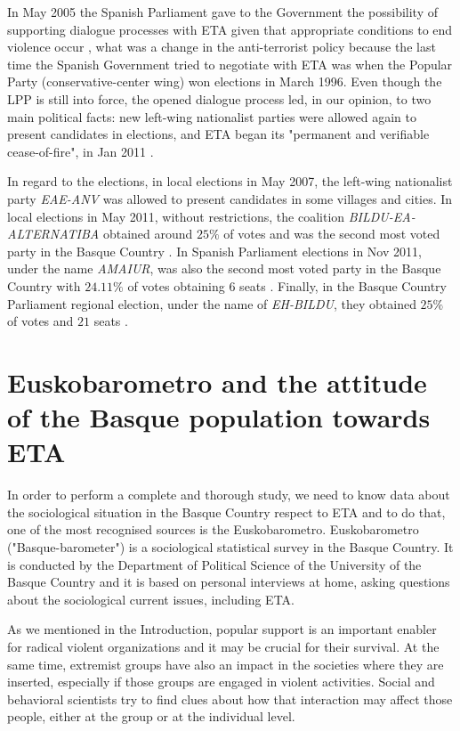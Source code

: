 In May 2005 the Spanish Parliament gave to the Government the possibility of supporting dialogue processes with ETA given that appropriate conditions to end violence occur \cite[Resoluci\'on 34, p. 13]{Congreso}, what was a change in the anti-terrorist policy because the last time the Spanish Government tried to negotiate with ETA was when the Popular Party (conservative-center wing) won elections in March 1996. Even though the LPP is still into force, the opened dialogue process led, in our opinion, to two main political facts: new left-wing nationalist parties were allowed again to present candidates in elections, and ETA began its "permanent and verifiable cease-of-fire", in Jan 2011 \cite{ceaseFire}. 

In regard to the elections, in local elections in May 2007, the left-wing nationalist party \textit{EAE-ANV} was allowed to present candidates in some villages and cities. In local elections in May 2011, without  restrictions, the coalition \textit{BILDU-EA-ALTERNATIBA} obtained around $25\%$ of votes and was the second most voted party in the Basque Country \cite{mir}. In Spanish Parliament elections in Nov 2011, under the name \textit{AMAIUR}, was also the second most voted party in the Basque Country with $24.11\%$ of votes obtaining $6$ seats \cite{mir}. Finally, in the Basque Country Parliament regional election, under the name of \textit{EH-BILDU}, they obtained $25\%$ of votes and $21$ seats \cite{ev2012}. \label{datosElec}

\section{Euskobarometro and the attitude of the Basque population towards ETA}
In order to perform a complete and thorough study, we need to know data about the sociological situation in the Basque Country respect to ETA and to do that, one of the most recognised sources is the Euskobarometro. Euskobarometro \cite{eusko} ("Basque-barometer") is a sociological statistical survey in the Basque Country. It is conducted by the Department of Political Science of the University of the Basque Country and it is based on personal interviews at home, asking questions about the sociological current issues, including ETA.  

As we mentioned in the Introduction, popular support is an important enabler for radical violent organizations and it may be crucial for their survival. At the same time, extremist groups have also an impact in the societies where they are inserted, especially if those groups are engaged in violent activities. Social and behavioral scientists try to find clues about how that interaction may affect those people, either at the group or at the individual level. 

